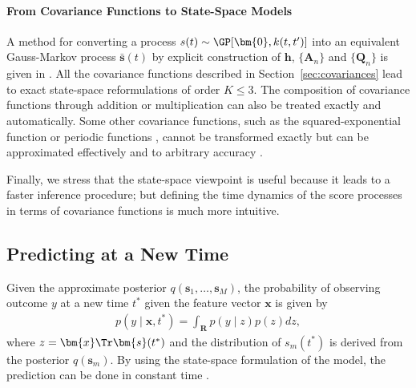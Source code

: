 \paragraph{From Covariance Functions to State-Space Models}
A method for converting a process $s(t) \sim \GP[\bm{0}, k(t, t')]$ into an equivalent Gauss-Markov process $\bar{\bm{s}}(t)$ by explicit construction of $\bm{h}$, $\{\bm{A}_n\}$ and $\{\bm{Q}_n\}$ is given in \citet{solin2016stochastic}.
All the covariance functions described in Section~\ref{sec:covariances} lead to exact state-space reformulations of order $K \leq 3$.
The composition of covariance functions through addition or multiplication can also be treated exactly and automatically.
Some other covariance functions, such as the squared-exponential function or periodic functions \citep{rasmussen2006gaussian}, cannot be transformed exactly but can be approximated effectively and to arbitrary accuracy \citep{hartikainen2010kalman, solin2014explicit}.

Finally, we stress that the state-space viewpoint is useful because it leads to a faster inference procedure; but defining the time dynamics of the score processes in terms of covariance functions is much more intuitive.


\subsection{Predicting at a New Time}

Given the approximate posterior $q(\bm{s}_1, \ldots, \bm{s}_M)$, the probability of observing outcome $y$ at a new time $t^*$ given the feature vector $\bm{x}$ is given by
\begin{align*}
p(y \mid \bm{x}, t^*) = \int_\mathbf{R} p(y \mid z) p(z) dz,
\end{align*}
where $z = \bm{x}\Tr \bm{s}(t^*)$ and the distribution of $s_m(t^*)$ is derived from the posterior $q(\bm{s}_m)$.
By using the state-space formulation of the model, the prediction can be done in constant time \citep{saatci2012scalable}.
